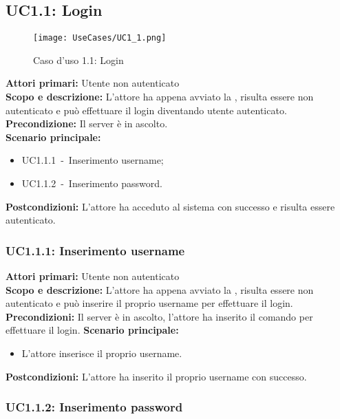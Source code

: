 \documentclass{scalatekids-article}
\begin{document}
\subsection{UC1.1: Login}

\begin{figure}[H]
  \begin{center}
    \texttt{[image: UseCases/UC1\_1.png]}
    \caption*{Caso d'uso 1.1: Login}
  \end{center}
\end{figure}
\textbf{Attori primari:} Utente non autenticato\\
\textbf{Scopo e descrizione:}
L’attore ha appena avviato la , risulta essere non autenticato e può effettuare il login diventando utente
autenticato.\\
\textbf{Precondizione:} Il server è in ascolto.\\
\textbf{Scenario principale:}
\begin{itemize}
\item UC1.1.1\ -\ Inserimento username;
\item UC1.1.2\ -\ Inserimento password.
\end{itemize}
\textbf{Postcondizioni:} L'attore ha acceduto al sistema con successo e risulta essere autenticato.

\subsubsection{UC1.1.1: Inserimento username}

\textbf{Attori primari:} Utente non autenticato\\
\textbf{Scopo e descrizione:}
L'attore ha appena avviato la , risulta essere non autenticato e può inserire il proprio username per effettuare il login.\\
\textbf{Precondizioni:} Il server è in ascolto, l'attore ha inserito il comando per effettuare il login.
\textbf{Scenario principale:}
\begin{itemize}
\item L'attore inserisce il proprio username.
\end{itemize}
\textbf{Postcondizioni:} L'attore ha inserito il proprio username con successo.

\subsubsection{UC1.1.2: Inserimento password}
\end{document}
